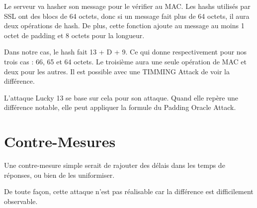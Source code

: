 Le serveur va hasher son message pour le vérifier au MAC. Les hashs utilisés par SSL
ont des blocs de 64 octets, donc si un message fait plus de 64 octets, il aura deux
opérations de hash. De plus, cette fonction ajoute au message au moins 1 octet de 
padding et 8 octets pour la longueur.

Dans notre cas, le hash fait 13 + D + 9. Ce qui donne respectivement pour nos trois cas :
66, 65 et 64 octets. Le troisième aura une seule opération de MAC et deux pour les autres.
Il est possible avec une TIMMING Attack de voir la différence. 

L'attaque Lucky 13 se base sur cela pour son attaque. Quand elle repère une différence
notable, elle peut appliquer la formule du Padding Oracle Attack.

\section{Contre-Mesures}
\label{sec:cmL13}

Une contre-mesure simple serait de rajouter des délais dans les temps de réponses,
ou bien de les uniformiser.

De toute façon, cette attaque n'est pas réalisable car la différence est difficilement observable. 
